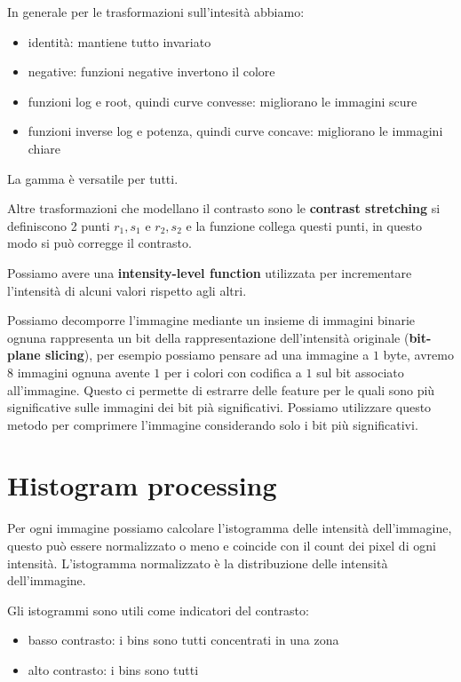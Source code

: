 In generale per le trasformazioni sull'intesità abbiamo:
\begin{itemize}
    \item identità: mantiene tutto invariato
    \item negative: funzioni negative invertono il colore 
    \item funzioni log e root, quindi curve convesse: migliorano le immagini scure 
    \item funzioni inverse log e potenza, quindi curve concave: migliorano le immagini chiare 
\end{itemize}
La gamma è versatile per tutti.

Altre trasformazioni che modellano il contrasto sono le \textbf{contrast stretching}
si definiscono 2 punti $r_1,s_1$ e $r_2,s_2$ e la funzione collega questi punti,
in questo modo si può corregge il contrasto.

Possiamo avere una \textbf{intensity-level function} utilizzata per incrementare l'intensità
di alcuni valori rispetto agli altri.

Possiamo decomporre l'immagine mediante un insieme di immagini binarie ognuna rappresenta 
un bit della rappresentazione dell'intensità originale (\textbf{bit-plane slicing}), per esempio possiamo pensare 
ad una immagine a $1$ byte, avremo $8$ immagini ognuna avente $1$ per i colori 
con codifica a $1$ sul bit associato all'immagine. Questo ci permette di estrarre 
delle feature per le quali sono più significative sulle immagini dei bit
pià significativi. Possiamo utilizzare questo metodo per comprimere l'immagine
considerando solo i bit più significativi.

\section{Histogram processing}
Per ogni immagine possiamo calcolare l'istogramma delle intensità dell'immagine,
questo può essere normalizzato o meno e coincide con il count dei pixel di ogni intensità.
L'istogramma normalizzato è la distribuzione delle intensità dell'immagine.

Gli istogrammi sono utili come indicatori del contrasto:
\begin{itemize}
    \item basso contrasto: i bins sono tutti concentrati in una zona
    \item alto contrasto: i bins sono tutti 
\end{itemize}